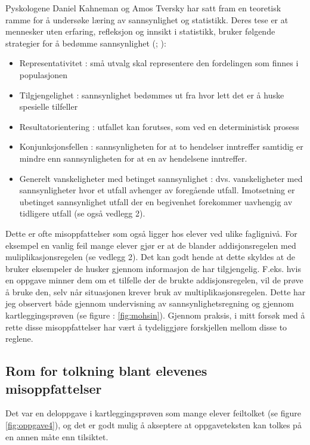 \documentclass[main.tex]{subfiles}
\begin{document}
Pyskologene Daniel Kahneman og Amos Tversky har satt fram en teoretisk 
ramme for å undersøke læring av sannsynlighet og statistikk. Deres tese er at mennesker uten erfaring, refleksjon og 
innsikt i statistikk, bruker følgende strategier for å bedømme sannsynlighet (; ):
\begin{itemize}
\item Representativitet : små utvalg skal representere den fordelingen som finnes i populasjonen
\item Tilgjengelighet : sannsynlighet bedømmes ut fra hvor lett det er å huske spesielle tilfeller
\item Resultatorientering : utfallet kan forutses, som ved en deterministisk prosess
\item Konjunksjonsfellen : sannsynligheten for at to hendelser inntreffer samtidig er mindre enn sannsynligheten
for at en av hendelsene inntreffer.
\item Generelt vanskeligheter med betinget sannsynlighet : dvs. vanskeligheter med sannsynligheter hvor et utfall
avhenger av foregående utfall. Imotsetning er ubetinget sannsynlighet utfall der en begivenhet forekommer uavhengig 
av tidligere utfall (se også vedlegg 2). 
\end{itemize}
Dette er ofte misoppfattelser som også ligger hos elever ved ulike faglignivå. For eksempel en vanlig feil
mange elever gjør er at de blander addisjonsregelen med muliplikasjonsregelen (se vedlegg 2). Det kan godt hende at dette
skyldes at de bruker eksempeler de husker gjennom informasjon de har tilgjengelig. F.eks. hvis en oppgave minner
dem om et tilfelle der de brukte addisjonsregelen, vil de prøve å bruke den, selv når situasjonen krever bruk
av multiplikasjonsregelen. Dette har jeg observert både gjennom undervisning av sannsynlighetsregning og
gjennom kartleggingsprøven (se figure : \ref{fig:mohsin}). Gjennom praksis, i mitt forsøk med å rette disse 
misoppfattelser har vært å tydeliggjøre forskjellen mellom disse to reglene. 

\subsection*{Rom for tolkning blant elevenes misoppfattelser}
Det var en deloppgave i kartleggingsprøven som mange elever feiltolket (se figure \ref{fig:oppgave4}), og det er 
godt mulig å akseptere at oppgaveteksten kan tolkes på en annen måte enn tilsiktet.
\end{document}
